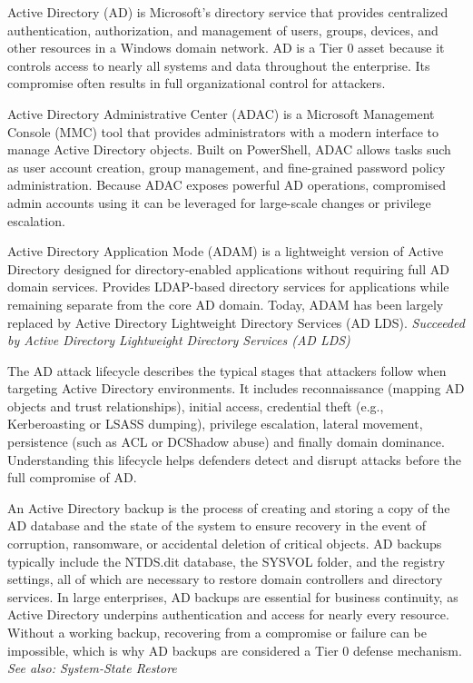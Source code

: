  Active Directory (AD) is Microsoft’s directory service that provides centralized authentication, authorization, and management of users, groups, devices, and other resources in a Windows domain network. AD is a Tier 0 asset because it controls access to nearly all systems and data throughout the enterprise. Its compromise often results in full organizational control for attackers.

 Active Directory Administrative Center (ADAC) is a Microsoft Management Console (MMC) tool that provides administrators with a modern interface to manage Active Directory objects. Built on PowerShell, ADAC allows tasks such as user account creation, group management, and fine-grained password policy administration. Because ADAC exposes powerful AD operations, compromised admin accounts using it can be leveraged for large-scale changes or privilege escalation.

 Active Directory Application Mode (ADAM) is a lightweight version of Active Directory designed for directory-enabled applications without requiring full AD domain services. Provides LDAP-based directory services for applications while remaining separate from the core AD domain. Today, ADAM has been largely replaced by Active Directory Lightweight Directory Services (AD LDS).
\textit{Succeeded by Active Directory Lightweight Directory Services (AD LDS)}

 The AD attack lifecycle describes the typical stages that attackers follow when targeting Active Directory environments. It includes reconnaissance (mapping AD objects and trust relationships), initial access, credential theft (e.g., Kerberoasting or LSASS dumping), privilege escalation, lateral movement, persistence (such as ACL or DCShadow abuse) and finally domain dominance. Understanding this lifecycle helps defenders detect and disrupt attacks before the full compromise of AD.

 An Active Directory backup is the process of creating and storing a copy of the AD database and the state of the system to ensure recovery in the event of corruption, ransomware, or accidental deletion of critical objects. AD backups typically include the NTDS.dit database, the SYSVOL folder, and the registry settings, all of which are necessary to restore domain controllers and directory services. In large enterprises, AD backups are essential for business continuity, as Active Directory underpins authentication and access for nearly every resource. Without a working backup, recovering from a compromise or failure can be impossible, which is why AD backups are considered a Tier 0 defense mechanism.
\textit{See also: System-State Restore}

